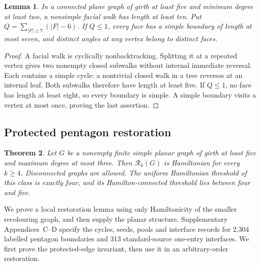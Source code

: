 \documentclass[11pt]{article}
\newtheorem{theorem}{Theorem}[section]
\newtheorem{lemma}[theorem]{Lemma}
\theoremstyle{remark}
\newcommand{\Rk}{\mathcal R_k}
\numberwithin{equation}{section}
\numberwithin{table}{section}
\begin{document}
\begin{lemma}\label{lem:short-facial-walks}
In a connected plane graph of girth at least five and minimum degree at
least two, a nonsimple facial walk has length at least ten. Put
$Q=\sum_{|F|\ge7}(|F|-6)$. If $Q\le1$, every face has a simple boundary of length at most seven, and distinct
angles at any vertex belong to distinct faces.
\end{lemma}
\begin{proof}
A facial walk is cyclically nonbacktracking. Splitting it at a repeated
vertex gives two nonempty closed subwalks without internal immediate
reversal. Each contains a simple cycle: a nontrivial closed walk in a tree
reverses at an internal leaf. Both subwalks therefore have length at least
five. If $Q\le1$, no face has length at least eight, so every boundary is
simple. A simple boundary visits a vertex at most once, proving the last
assertion.
\end{proof}

\subsection{Protected pentagon restoration}
\begin{theorem}\label{thm:subcubic}
Let $G$ be a nonempty finite simple planar graph of girth at least five
and maximum degree at most three. Then $\Rk(G)$ is Hamiltonian for
every $k\ge4$. Disconnected graphs are allowed. The uniform Hamiltonian threshold
of this class is exactly four, and its Hamilton-connected threshold lies
between four and five.
\end{theorem}

We prove a local restoration lemma using only Hamiltonicity of the
smaller recolouring graph, and then supply the planar structure.
Supplementary Appendices~C--D specify the cycles, seeds, pools and
interface records for 2,304 labelled pentagon boundaries and 313
standard-source one-entry interfaces. We first prove the protected-edge
invariant, then use it in an arbitrary-order restoration.
\end{document}
